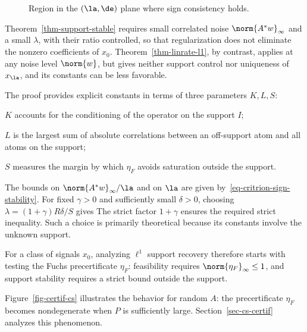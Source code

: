 	\begin{figure}[tbp]
\centering
{}
\caption{Region in the $(\la,\de)$ plane where sign consistency holds.}
\label{fig-review-sparse-theory-recovery-region}
\end{figure}
	
Theorem~\ref{thm-support-stable} requires small correlated noise $\norm{A^*w}_\infty$ and a small $\lambda$, with their ratio controlled, so that regularization does not eliminate the nonzero coefficients of $x_0$. Theorem~\ref{thm-linrate-l1}, by contrast, applies at any noise level $\norm{w}$, but gives neither support control nor uniqueness of $x_\la$, and its constants can be less favorable.

The proof provides explicit constants in terms of three parameters $K,L,S$:
\begin{rs}
	\item $K$ accounts for the conditioning of the operator on the support $I$;
	\item $L$ is the largest sum of absolute correlations between an off-support atom and all atoms on the support;
    \item $S$ measures the margin by which $\eta_F$ avoids saturation outside the support.
\end{rs}
The bounds on $\norm{A^*w}_\infty/\la$ and on $\la$ are given by~\eqref{eq-critrion-sign-stability}. For fixed $\gamma>0$ and sufficiently small $\delta>0$, choosing $\lambda=(1+\gamma)R\delta/S$ gives
The strict factor $1+\gamma$ ensures the required strict inequality. Such a choice is primarily theoretical because its constants involve the unknown support.

For a class of signals $x_0$, analyzing $\ell^1$ support recovery therefore starts with testing the Fuchs precertificate $\eta_F$: feasibility requires $\norm{\eta_F}_\infty \leq 1$, and support stability requires a strict bound outside the support.
 
Figure~\ref{fig-certif-cs} illustrates the behavior for random $A$: the precertificate $\eta_F$ becomes nondegenerate when $P$ is sufficiently large. Section~\ref{sec-cs-certif} analyzes this phenomenon.




